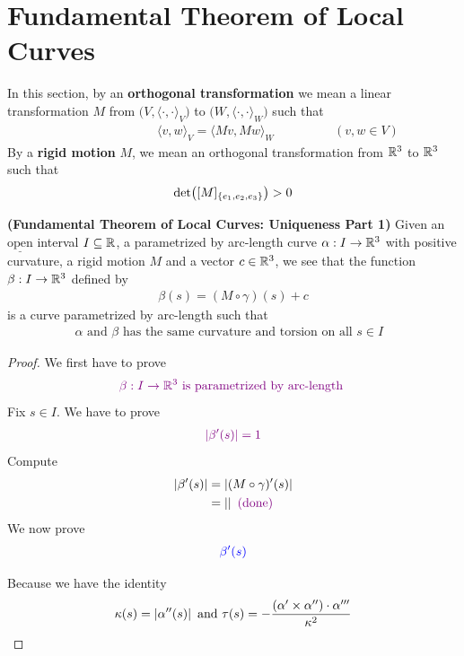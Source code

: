 \documentclass{report}
\begin{document}
\section{Fundamental Theorem of Local Curves}
\begin{mdframed}
In this section, by an \textbf{orthogonal transformation} we mean a linear transformation $M$ from  $\big(V,\langle \cdot,\cdot\rangle_V  \big)$ to $\big(W,\langle \cdot,\cdot\rangle_W  \big)$ such that 
\begin{align*}
\hspace{3cm}\langle v,w\rangle_V =\langle Mv,Mw\rangle_W\hspace{2cm}(v,w \in V)
\end{align*}
By a \textbf{rigid motion} $M$, we mean an orthogonal transformation from $\mathbb{R}^3$ to  $\mathbb{R}^3$ such that 
\begin{align*}
\text{det}\big([M]_{\{ e_1,e_2,e_3 \}} \big)>0
\end{align*}
\end{mdframed}
\begin{theorem}
\textbf{(Fundamental Theorem of Local Curves: Uniqueness Part 1)} Given an $\underline{\text{open}}$ interval $I \subseteq \mathbb{R}$, a parametrized by arc-length curve $\alpha :I \rightarrow \mathbb{R}^3$ with positive curvature, a rigid motion $M$ and a vector  $c \in\mathbb{R}^3$, we see that the function  $\beta : I \rightarrow \mathbb{R}^3 $ defined by 
\begin{align*}
\beta (s)=(M \circ \gamma )(s)+c
\end{align*}
is a curve parametrized by arc-length such that 
\begin{align*}
\alpha \text{ and }\beta \text{ has the same curvature and torsion on all $s \in I$ }
\end{align*}
\end{theorem}
\begin{proof}
We first have to prove 
\begin{align*}
\textcolor{violet}{\beta :I\rightarrow \mathbb{R}^3\text{ is parametrized by arc-length }}
\end{align*}
Fix $s \in I$. We have to prove 
\begin{align*}
\textcolor{violet}{\left|\beta '(s)\right|=1}
\end{align*}
Compute 
\begin{align*}
\left|\beta '(s)\right|&=\left|(M\circ \gamma )'(s)\right|\\
&=\left|\right|\textcolor{violet}{\text{ (done) }}
\end{align*}
We now prove 
\begin{align*}
\textcolor{blue}{\beta '(s)}
\end{align*}

Because we have the identity 
\begin{align*}
\kappa (s)=\left|\alpha ''(s)\right|\text{ and }\tau (s)=-\frac{(\alpha '\times \alpha '')\cdot \alpha '''}{\kappa^2}
\end{align*}
\end{proof}
\end{document}
